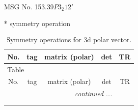 \documentclass[fleqn,8pt]{jsarticle}
\begin{document}
\setcounter{MaxMatrixCols}{32}

\renewcommand{\tablename}{Table~}
\renewcommand{\figurename}{Figure~}
\begin{center}
\LARGE
MSG No. 153.39\quad$P3_{2}12'$
\end{center}
* symmetry operation
\renewcommand{\arraystretch}{1.3}
\begin{longtable}{ccccc}
\caption{Symmetry operations for 3d polar vector.}
 \\
 \hline \hline
No. & tag & matrix (polar) & det & TR \\ \hline \endfirsthead

\multicolumn{4}{l}{\tablename\ \thetable{}} \\
 \hline \hline
No. & tag & matrix (polar) & det & TR \\ \hline \endhead

 \hline \hline
\multicolumn{4}{r}{\footnotesize\it continued ...} \\ \endfoot

 \hline \hline
\multicolumn{4}{r}{} \\ \endlastfoot


\end{longtable}
\end{document}
